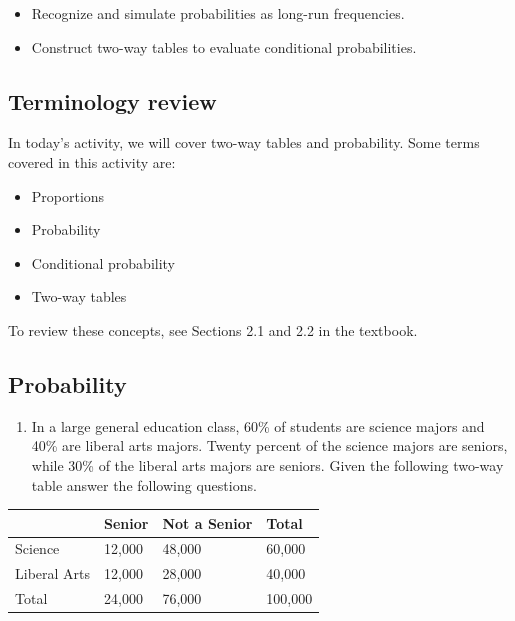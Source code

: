 \documentclass[
]{report}
\providecommand{\tightlist}{%
  \setlength{\itemsep}{0pt}\setlength{\parskip}{0pt}}
\begin{document}
\begin{itemize}
\item
  Recognize and simulate probabilities as long-run frequencies.
\item
  Construct two-way tables to evaluate conditional probabilities.
\end{itemize}

\hypertarget{terminology-review-22}{%
\subsection{Terminology review}\label{terminology-review-22}}

In today's activity, we will cover two-way tables and probability. Some terms covered in this activity are:

\begin{itemize}
\item
  Proportions
\item
  Probability
\item
  Conditional probability
\item
  Two-way tables
\end{itemize}

To review these concepts, see Sections 2.1 and 2.2 in the textbook.

\hypertarget{probability}{%
\subsection{Probability}\label{probability}}

\begin{enumerate}
\def\labelenumi{\arabic{enumi}.}
\tightlist
\item
  In a large general education class, 60\% of students are science majors and 40\% are liberal arts majors. Twenty percent of the science majors are seniors, while 30\% of the liberal arts majors are seniors. Given the following two-way table answer the following questions.
\end{enumerate}

\begin{longtable}[]{@{}llll@{}}
\toprule
& Senior & Not a Senior & Total \\
\midrule
\endhead
Science & 12,000 & 48,000 & 60,000 \\
Liberal Arts & 12,000 & 28,000 & 40,000 \\
Total & 24,000 & 76,000 & 100,000 \\
\bottomrule
\end{longtable}
\end{document}

